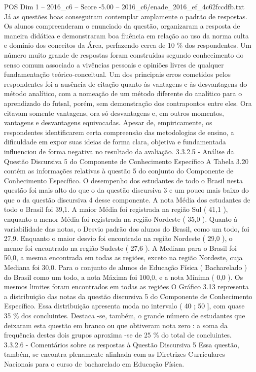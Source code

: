 \begin{textsample}{POS Dim 1 – 2016\_c6 – Score -5.00 – 2016\_c6/enade\_2016\_ef\_4c62fccdfb.txt}
Já as questões boas conseguiram contemplar amplamente o padrão de respostas.
Os alunos compreenderam o enunciado da questão, organizaram a resposta de maneira didática e demonstraram boa fluência em relação ao uso da norma culta e domínio dos conceitos da Área, perfazendo cerca de 10 \% dos respondentes.
Um número muito grande de respostas foram construídas segundo conhecimento do senso comum associado a vivências pessoais e opiniões livres de qualquer fundamentação teórico-conceitual.
Um dos principais erros cometidos pelos respondentes foi a ausência de citação quanto às vantagens e às desvantagens do método analítico, com a nomeação de um método diferente do analítico para o aprendizado do futsal, porém, sem demonstração dos contrapontos entre eles.
Ora citavam somente vantagens, ora só desvantagens e, em outros momentos, vantagens e desvantagens equivocadas.
Apesar de, empiricamente, os respondentes identificarem certa compreensão das metodologias de ensino, a dificuldade em expor suas ideias de forma clara, objetiva e fundamentada influenciou de forma negativa no resultado da avaliação. 3.3.2.5 - Análise da Questão Discursiva 5 do Componente de Conhecimento Específico A Tabela 3.20 contém as informações relativas à questão 5 do conjunto do Componente de Conhecimento Específico.
O desempenho dos estudantes de todo o Brasil nesta questão foi mais alto do que o da questão discursiva 3 e um pouco mais baixo do que o da questão discursiva 4 desse componente.
A nota Média dos estudantes de todo o Brasil foi 39,1.
A maior Média foi registrada na região Sul ( 41,1 ), enquanto a menor Média foi registrada na região Nordeste ( 35,0 ).
Quanto à variabilidade das notas, o Desvio padrão dos alunos do Brasil, como um todo, foi 27,9.
Enquanto o maior desvio foi encontrado na região Nordeste ( 29,0 ), o menor foi encontrado na região Sudeste ( 27,6 ).
A Mediana para o Brasil foi 50,0, a mesma encontrada em todas as regiões, exceto na região Nordeste, cuja Mediana foi 30,0.
Para o conjunto de alunos de Educação Física ( Bacharelado ) do Brasil como um todo, a nota Máxima foi 100,0, e a nota Mínima ( 0,0 ).
Os mesmos limites foram encontrados em todas as regiões O Gráfico 3.13 representa a distribuição das notas da questão discursiva 5 do Componente de Conhecimento Específico.
Essa distribuição apresenta moda no intervalo ( 40 ; 50 ], com quase 35 \% dos concluintes.
Destaca -se, também, o grande número de estudantes que deixaram esta questão em branco ou que obtiveram nota zero : a soma da frequência destes dois grupos aproxima -se de 25 \% do total de concluintes. 3.3.2.6 - Comentários sobre as respostas à Questão Discursiva 5 Essa questão, também, se encontra plenamente alinhada com as Diretrizes Curriculares Nacionais para o curso de bacharelado em Educação Física.

\end{textsample}
